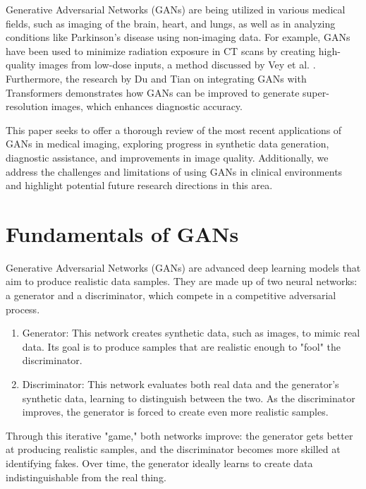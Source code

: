 \documentclass[12pt]{article}
\begin{document}
Generative Adversarial Networks (GANs) are being utilized in various medical fields, such as imaging of the brain, heart, and lungs, as well as in analyzing conditions like Parkinson's disease using non-imaging data. For example, GANs have been used to minimize radiation exposure in CT scans by creating high-quality images from low-dose inputs, a method discussed by Vey et al. \cite{Vey2019}. Furthermore, the research by Du and Tian \cite{Du2024} on integrating GANs with Transformers demonstrates how GANs can be improved to generate super-resolution images, which enhances diagnostic accuracy.

This paper seeks to offer a thorough review of the most recent applications of GANs in medical imaging, exploring progress in synthetic data generation, diagnostic assistance, and improvements in image quality. Additionally, we address the challenges and limitations of using GANs in clinical environments and highlight potential future research directions in this area.


\section{Fundamentals of GANs}

Generative Adversarial Networks (GANs) are advanced deep learning models that aim to produce realistic data samples. They are made up of two neural networks: a generator and a discriminator, which compete in a competitive adversarial process.

\begin{enumerate}
    
\item Generator: This network creates synthetic data, such as images, to mimic real data. Its goal is to produce samples that are realistic enough to "fool" the discriminator.
\item Discriminator: This network evaluates both real data and the generator’s synthetic data, learning to distinguish between the two. As the discriminator improves, the generator is forced to create even more realistic samples.

\end{enumerate}

Through this iterative "game," both networks improve: the generator gets better at producing realistic samples, and the discriminator becomes more skilled at identifying fakes. Over time, the generator ideally learns to create data indistinguishable from the real thing.
\end{document}
